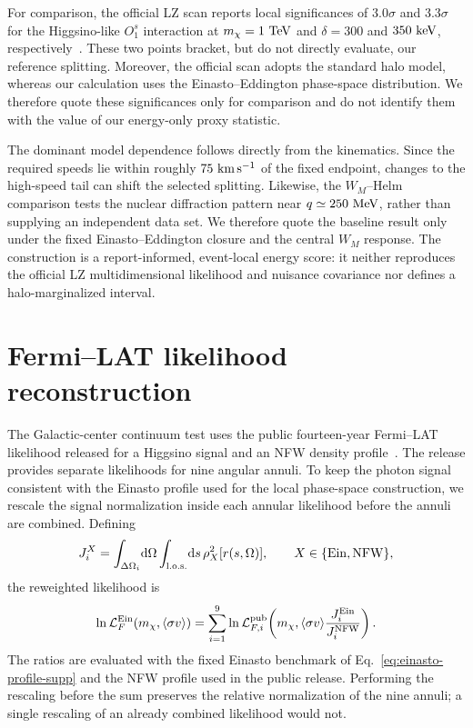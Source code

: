 \documentclass[%
  aps,
  prl,
  reprint,
  superscriptaddress,
  amsmath,
  amssymb,
  longbibliography
]{revtex4-2}
\begin{document}
{For comparison, the official LZ scan reports local significances of
\(3.0\sigma\) and \(3.3\sigma\) for the Higgsino-like \(O_1^s\) interaction
at \(m_\chi=1~{\rm TeV}\) and \(\delta=300\) and \(350~{\rm keV}\),
respectively~\cite{LZ:2026HighEnergy}.  These two points bracket, but do not
directly evaluate, our reference splitting.  Moreover, the official scan
adopts the standard halo model, whereas our calculation uses the
Einasto--Eddington phase-space distribution.  We therefore quote these
significances only for comparison and do not identify them with the value of
our energy-only proxy statistic.

The dominant model dependence follows directly from the kinematics.  Since
the required speeds lie within roughly \(75~{\rm km\,s^{-1}}\) of the fixed
endpoint, changes to the high-speed tail can shift the selected splitting.
Likewise, the \(W_M\)--Helm comparison tests the nuclear diffraction pattern
near \(q\simeq250~{\rm MeV}\), rather than supplying an independent data
set.  We therefore quote the baseline result only under the fixed
Einasto--Eddington closure and the central \(W_M\) response.  The construction
is a report-informed, event-local energy score: it neither reproduces the
official LZ multidimensional likelihood and nuisance covariance nor defines a
halo-marginalized interval.


\section{Fermi--LAT likelihood reconstruction}
\label{sec:fermi-likelihood-supp}

The Galactic-center continuum test uses the public fourteen-year
Fermi--LAT likelihood released for a Higgsino signal and an NFW density
profile~\cite{Dessert:2022evk}.  The release provides separate likelihoods
for nine angular annuli.  To keep the photon signal consistent with the
Einasto profile used for the local phase-space construction, we rescale the
signal normalization inside each annular likelihood before the annuli are
combined.  Defining
\begin{equation}
 J_i^X=\int_{\Delta\Omega_i}\!\mathrm{d}\Omega
 \int_{\rm l.o.s.}\!\mathrm{d}s\,\rho_X^2[r(s,\Omega)],
 \qquad X\in\{\mathrm{Ein},\mathrm{NFW}\},
 \label{eq:fermi-jfactor-supp}
\end{equation}
the reweighted likelihood is
\begin{equation}
 \ln {\cal L}^{\rm Ein}_F(m_\chi,\langle\sigma v\rangle)
 =\sum_{i=1}^{9}\ln {\cal L}^{\rm pub}_{F,i}\!\left(
 m_\chi,
 \langle\sigma v\rangle\frac{J_i^{\rm Ein}}{J_i^{\rm NFW}}
 \right).
 \label{eq:fermi-annulus-reweight-supp}
\end{equation}
The ratios are evaluated with the fixed Einasto benchmark of
Eq.~\eqref{eq:einasto-profile-supp} and the NFW profile used in the public
release.  Performing the rescaling before the sum preserves the relative
normalization of the nine annuli; a single rescaling of an already combined
likelihood would not.

}
\end{document}

